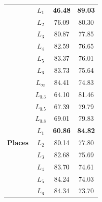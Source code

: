 \documentclass{article}
\begin{document}
\begin{table}[t]
\begin{tabular}{c|c|cc}
                                       & $L_{1}$                             & \textbf{46.48}       & \textbf{89.03}       \\
                                       & $L_{2}$                             & 76.09                & 80.30                \\
                                       & $L_{3}$                             & 80.87                & 77.85                \\
                                       & $L_{4}$                             & 82.59                & 76.65                \\
                                       & $L_{5}$                             & 83.37                & 76.01                \\
                                       & $L_{6}$                             & 83.73                & 75.64                \\
                                       & $L_{\infty}$                           & 84.41                & 74.83                \\ \midrule
\multirow{10}{*}{\textbf{Places}}      & $L_{0.3}$                          & 64.10                & 81.46                \\
                                       & $L_{0.5}$                           & 67.39                & 79.79                \\
                                       & $L_{0.8}$                          & 69.01                & 79.83                \\
                                       & $L_{1}$                             & \textbf{60.86}       & \textbf{84.82}       \\
                                       & $L_{2}$                             & 80.14                & 77.80                \\
                                       & $L_{3}$                             & 82.68                & 75.69                \\
                                       & $L_{4}$                             & 83.70                & 74.61                \\
                                       & $L_{5}$                             & 84.24                & 74.03                \\
                                       & $L_{6}$                             & 84.34                & 73.70                \\

\end{tabular}
\end{table}
\end{document}
